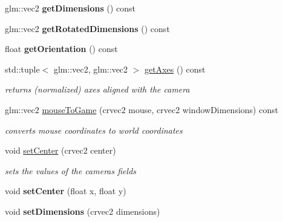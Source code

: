 \begin{DoxyCompactItemize}
glm\+::vec2 {\bfseries get\+Dimensions} () const
\item 
\mbox{\label{classnta_1_1Camera2D_a6b3b7c18d66f680c05087b94214bc98f}} 
glm\+::vec2 {\bfseries get\+Rotated\+Dimensions} () const
\item 
\mbox{\label{classnta_1_1Camera2D_a5cf5e5e022f29952af085a63980e737c}} 
float {\bfseries get\+Orientation} () const
\item 
\mbox{\label{classnta_1_1Camera2D_a395b5bfa81b603a3d4e78d6c54aa8212}} 
std\+::tuple$<$ glm\+::vec2, glm\+::vec2 $>$ \hyperlink{classnta_1_1Camera2D_a395b5bfa81b603a3d4e78d6c54aa8212}{get\+Axes} () const
\begin{DoxyCompactList}\small\item\em returns (normalized) axes aligned with the camera \end{DoxyCompactList}\item 
\mbox{\label{classnta_1_1Camera2D_afb20fb9823724babdc8d18b17336169c}} 
glm\+::vec2 \hyperlink{classnta_1_1Camera2D_afb20fb9823724babdc8d18b17336169c}{mouse\+To\+Game} (crvec2 mouse, crvec2 window\+Dimensions) const
\begin{DoxyCompactList}\small\item\em converts mouse coordinates to world coordinates \end{DoxyCompactList}\item 
\mbox{\label{classnta_1_1Camera2D_a11a7edceed0964b375fbfe154b9a9895}} 
void \hyperlink{classnta_1_1Camera2D_a11a7edceed0964b375fbfe154b9a9895}{set\+Center} (crvec2 center)
\begin{DoxyCompactList}\small\item\em sets the values of the camera\textquotesingle{}s fields \end{DoxyCompactList}\item 
\mbox{\label{classnta_1_1Camera2D_a5e887ee36c95789e3455ab2f3bb3f568}} 
void {\bfseries set\+Center} (float x, float y)
\item 
\mbox{\label{classnta_1_1Camera2D_a3b133bef64504b488b04ce18e206544b}} 
void {\bfseries set\+Dimensions} (crvec2 dimensions)

\end{DoxyCompactItemize}
